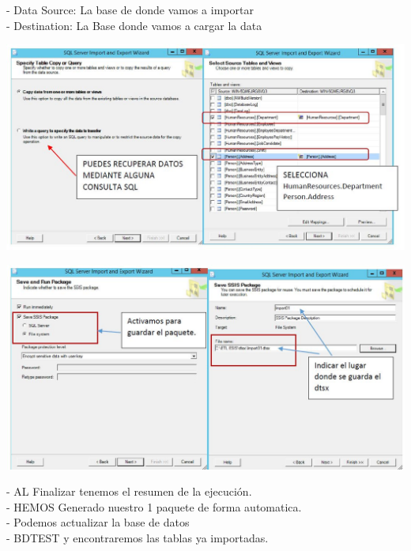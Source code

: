 \begin{itemize}
- Data Source: La base de donde vamos a importar\\
- Destination: La Base donde vamos a cargar la data

	\begin{center}
	\includegraphics[width=17cm]{./Imagenes/3}
	\end{center}	

	\begin{center}
	\includegraphics[width=17cm]{./Imagenes/4}
	\end{center}	

- AL Finalizar tenemos el resumen de la ejecución.\\
- HEMOS Generado nuestro 1 paquete de forma automatica.\\
- Podemos actualizar la base de datos\\
- BDTEST y encontraremos las tablas ya importadas.\\


\end{itemize}
